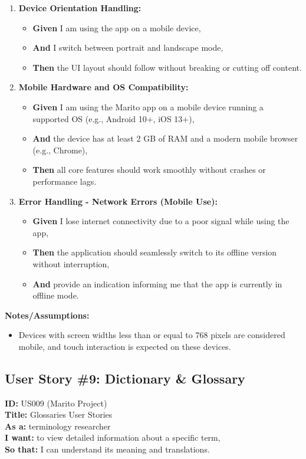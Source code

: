 \documentclass[12pt]{article}
\begin{document}
\begin{enumerate}
    \item \textbf{Device Orientation Handling:}
    \begin{itemize}
        \item \textbf{Given} I am using the app on a mobile device,
        \item \textbf{And} I switch between portrait and landscape mode,
        \item \textbf{Then} the UI layout should follow without breaking or cutting off content.
    \end{itemize}

    \item \textbf{Mobile Hardware and OS Compatibility:}
    \begin{itemize}
        \item \textbf{Given} I am using the Marito app on a mobile device running a supported OS (e.g., Android 10+, iOS 13+),
        \item \textbf{And} the device has at least 2 GB of RAM and a modern mobile browser (e.g., Chrome),
        \item \textbf{Then} all core features should work smoothly without crashes or performance lags.
    \end{itemize}

    \item \textbf{Error Handling - Network Errors (Mobile Use):}
    \begin{itemize}
        \item \textbf{Given} I lose internet connectivity due to a poor signal while using the app,
        \item \textbf{Then} the application should seamlessly switch to its offline version without interruption,
        \item \textbf{And} provide an indication informing me that the app is currently in offline mode.
    \end{itemize}
\end{enumerate}

\vspace{1em}
\textbf{Notes/Assumptions:}
\begin{itemize}
    \item Devices with screen widths less than or equal to 768 pixels are considered mobile, and touch interaction is expected on these devices.
\end{itemize}



\subsection{User Story \#9: Dictionary & Glossary}
\textbf{ID:} US009 (Marito Project) \\
\textbf{Title:} Glossaries User Stories \\
\textbf{As a:}  terminology researcher \\
\textbf{I want:}  to view detailed information about a specific term, \\
\textbf{So that:} I can understand its meaning and translations.
\end{document}
